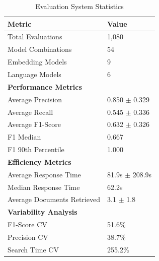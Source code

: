 \begin{table}[H]
\caption{Evaluation System Statistics}
\label{tab:enhanced_system_stats}
\begin{tabular}{ll}
\toprule
Metric & Value \\
\midrule
Total Evaluations & 1,080 \\
Model Combinations & 54 \\
Embedding Models & 9 \\
Language Models & 6 \\
\midrule
\textbf{Performance Metrics} & \\
Average Precision & 0.850 $\pm$ 0.329 \\
Average Recall & 0.545 $\pm$ 0.336 \\
Average F1-Score & 0.632 $\pm$ 0.326 \\
F1 Median & 0.667 \\
F1 90th Percentile & 1.000 \\
\midrule
\textbf{Efficiency Metrics} & \\
Average Response Time & 81.9s $\pm$ 208.9s \\
Median Response Time & 62.2s \\
Average Documents Retrieved & 3.1 $\pm$ 1.8 \\
\midrule
\textbf{Variability Analysis} & \\
F1-Score CV & 51.6\% \\
Precision CV & 38.7\% \\
Search Time CV & 255.2\% \\
\bottomrule
\end{tabular}
\end{table}